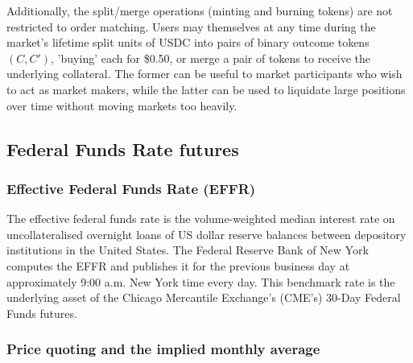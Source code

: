 Additionally, the split/merge operations (minting and burning tokens) are not restricted to order matching.
Users may themselves at any time during the market's lifetime split units of USDC into pairs of binary outcome tokens $(C, C')$, 'buying' each for \$0.50, or merge a pair of tokens to receive the underlying collateral.
The former can be useful to market participants who wish to act as market makers, while the latter can be used to liquidate large positions over time without moving markets too heavily.





\subsection{Federal Funds Rate futures}

\subsubsection{Effective Federal Funds Rate (EFFR)}

The effective federal funds rate is the volume-weighted median interest rate on uncollateralised overnight loans of US dollar reserve balances between depository institutions in the United States. The Federal Reserve Bank of New York computes the EFFR and publishes it for the previous business day at approximately 9:00 a.m. New York time every day. This benchmark rate is the underlying asset of the Chicago Mercantile Exchange’s (CME's) 30-Day Federal Funds futures. \parencite{FED_EFFR_NY}


\subsubsection{Price quoting and the implied monthly average}

